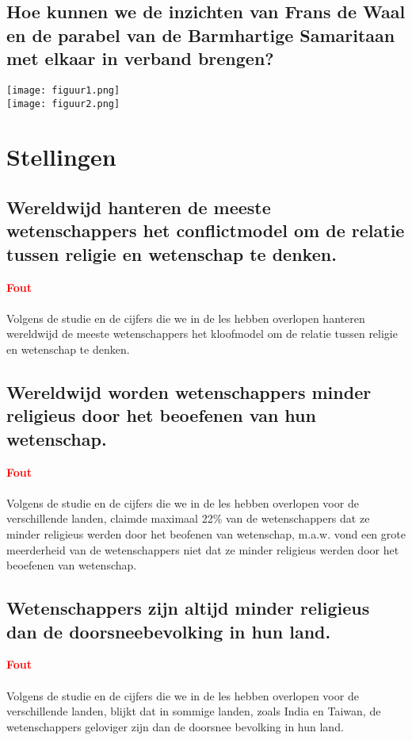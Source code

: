 \documentclass[11pt,a4paper,titlepage]{article}
\begin{document}
\subsection{ Hoe kunnen we de inzichten van Frans de Waal en de parabel van de Barmhartige Samaritaan met elkaar in verband brengen?}
\begin{center}
\texttt{[image: figuur1.png]} \\
\texttt{[image: figuur2.png]}
\end{center}

\section{Stellingen}

\subsection{Wereldwijd hanteren de meeste wetenschappers het conflictmodel om de relatie tussen
religie en wetenschap te denken. }
\textcolor{red}{\textbf{Fout}}\\\\
Volgens de studie en de cijfers die we in de les hebben overlopen hanteren wereldwijd de meeste wetenschappers het kloofmodel om de relatie tussen religie en wetenschap te denken.
\subsection{Wereldwijd worden wetenschappers minder religieus door het beoefenen van hun
wetenschap.}
\textcolor{red}{\textbf{Fout}}\\\\
Volgens de studie en de cijfers die we in de les hebben overlopen voor de verschillende landen, claimde maximaal 22\% van de wetenschappers dat ze minder religieus werden door het beofenen van wetenschap, m.a.w. vond een grote meerderheid van de wetenschappers niet dat ze minder religieus werden door het beoefenen van wetenschap.

\subsection{Wetenschappers zijn altijd minder religieus dan de doorsneebevolking in hun land.}
\textcolor{red}{\textbf{Fout}}\\\\
Volgens de studie en de cijfers die we in de les hebben overlopen voor de verschillende landen, blijkt dat in sommige landen, zoals India en Taiwan, de wetenschappers geloviger zijn dan de doorsnee bevolking in hun land.
\end{document}
